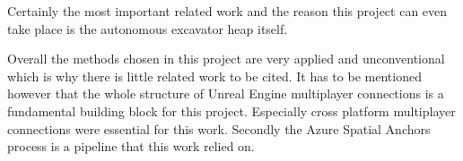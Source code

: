 
Certainly the most important related work and the reason this project can even take place is the autonomous excavator heap\citep*{heap} itself. 

Overall the methods chosen in this project are very applied and unconventional which is why there is little related work to be cited. It has to be mentioned however that the whole structure of Unreal Engine multiplayer connections is a fundamental building block for this project. Especially cross platform multiplayer connections were essential for this work. Secondly the Azure Spatial Anchors process is a pipeline that this work relied on.